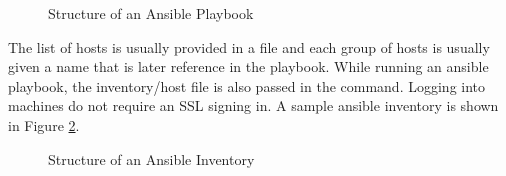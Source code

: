 \documentclass[9pt,twocolumn,twoside]{styles/osajnl}
\begin{document}
\begin{figure}[htbp]
\centering
{}
\caption{Structure of an Ansible Playbook \cite{www-ansible}}
\label{fig:playbook}
\end{figure}
The list of hosts is usually provided in a file and each group of hosts is usually given a name that is later reference in the playbook. While running an ansible playbook, the inventory/host file is also passed in the command. Logging into machines do not require an SSL signing in. A sample ansible inventory is shown in Figure \ref{fig:inventory}. 
\begin{figure}[htbp]
\centering
{}
\caption{Structure of an Ansible Inventory \cite{www-ansible}}
\label{fig:inventory}
\end{figure}
\end{document}
